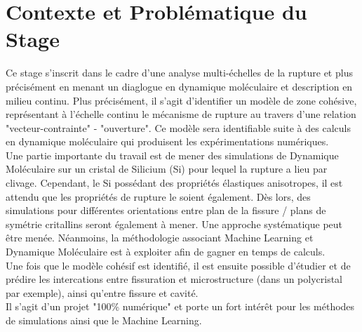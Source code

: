 \section{Contexte et Problématique du Stage} %

    Ce stage s'inscrit dans le cadre d'une analyse multi-échelles de la rupture et plus précisément en menant un diaglogue en dynamique moléculaire et description en milieu continu. Plus précisément, il s'agit d'identifier un modèle de zone cohésive, représentant à l'échelle continu le mécanisme de rupture au travers d'une relation "vecteur-contrainte" - "ouverture". Ce modèle sera identifiable suite à des calculs en dynamique moléculaire qui produisent les expérimentations numériques. \\

    Une partie importante du travail est de mener des simulations de Dynamique Moléculaire sur un cristal de Silicium (Si) pour lequel la rupture a lieu par clivage. Cependant, le Si possédant des propriétés élastiques anisotropes, il est attendu que les propriétés de rupture le soient également. Dès lors, des simulations pour différentes orientations entre plan de la fissure / plans de symétrie critallins seront également à mener. Une approche systématique peut être menée. Néanmoins, la méthodologie associant Machine Learning et Dynamique Moléculaire est à exploiter afin de gagner en temps de calculs. \\
    
    Une fois que le modèle cohésif est identifié, il est ensuite possible d'étudier et de prédire les intercations entre fissuration et microstructure (dans un polycristal par exemple), ainsi qu'entre fissure et cavité. \\

    Il s'agit d'un projet "100\% numérique" et porte un fort intérêt pour les méthodes de simulations ainsi que le Machine Learning.
